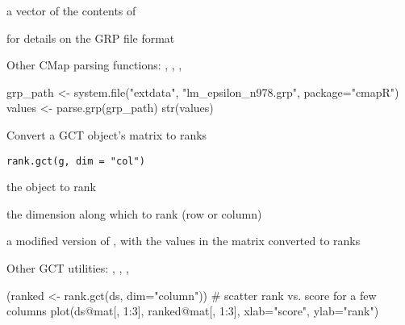 \documentclass[letterpaper]{book}
\begin{document}
%
\begin{Value}
a vector of the contents of 
\end{Value}
%
\begin{SeeAlso}\relax
{} for details on the GRP file format

Other CMap parsing functions: ,
, ,
\end{SeeAlso}
%
\begin{Examples}
\begin{ExampleCode}
grp_path <- system.file("extdata", "lm_epsilon_n978.grp", package="cmapR")
values <- parse.grp(grp_path)
str(values)
\end{ExampleCode}
\end{Examples}
%
\begin{Description}\relax
Convert a GCT object's matrix to ranks
\end{Description}
%
\begin{Usage}
\begin{verbatim}
rank.gct(g, dim = "col")
\end{verbatim}
\end{Usage}
%
\begin{Arguments}
\begin{ldescription}
\item[\code{g}] the  object to rank

\item[\code{dim}] the dimension along which to rank
(row or column)
\end{ldescription}
\end{Arguments}
%
\begin{Value}
a modified version of , with the
values in the matrix converted to ranks
\end{Value}
%
\begin{SeeAlso}\relax
Other GCT utilities: ,
, ,
\end{SeeAlso}
%
\begin{Examples}
\begin{ExampleCode}
(ranked <- rank.gct(ds, dim="column"))
# scatter rank vs. score for a few columns
plot(ds@mat[, 1:3], ranked@mat[, 1:3],
  xlab="score", ylab="rank")

\end{ExampleCode}
\end{Examples}
\end{document}
